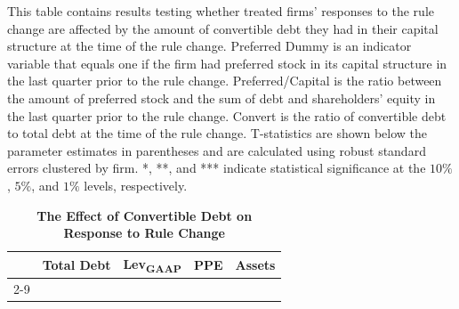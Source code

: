 \documentclass[a4paper, 12pt]{article}
\begin{document}
\begin{landscape}
\pagestyle{empty}

\begin{table}[htbp]
\caption{\textbf{The Effect of Convertible Debt on Response to Rule Change}} \label{table_convert}
\begin{singlespace}
\begin{small}

\noindent   This table contains results testing whether treated firms' responses to the rule change are affected by the amount of convertible debt they had in their capital structure at the time of the rule change. Preferred Dummy is an indicator variable that equals one if the firm had preferred stock in its capital structure in the last quarter prior to the rule change. Preferred/Capital is the ratio between the amount of preferred stock and the sum of debt and shareholders' equity in the last quarter prior to the rule change. Convert is the ratio of convertible debt to total debt at the time of the rule change. T-statistics are shown below the parameter estimates in parentheses and are calculated using robust standard errors clustered by firm. *, **, and *** indicate statistical significance at the $10\%$, $5\%$, and $1\%$ levels, respectively.
\end{small}
\end{singlespace}
\vspace{3mm}

\small
  \centering
    \begin{tabular}{lcccccccc}
    \toprule
        \textbf{ } &
      \multicolumn{2}{c}{\textbf{Total Debt}} &  \multicolumn{2}{c}{\textbf{Lev\textsubscript{GAAP}}} &
         \multicolumn{2}{c}{\textbf{PPE}} &  \multicolumn{2}{c}{\textbf{Assets}}
      \\
           \cline{2-9}




    \bottomrule
    \end{tabular}
\end{table}
\end{landscape}


\clearpage
\newpage
\end{document}
